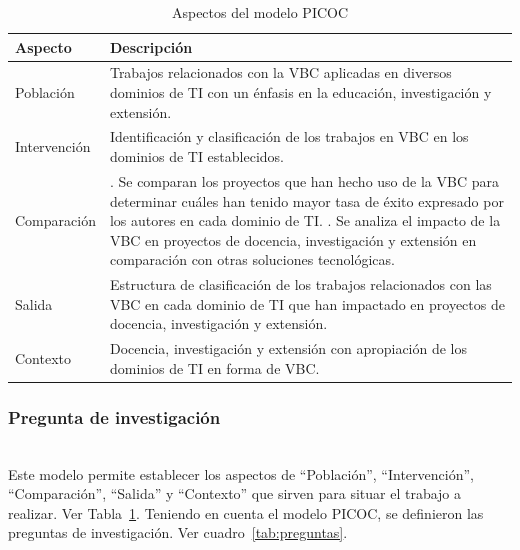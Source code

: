\begin{table}[tbp]
    \centering
    \renewcommand{\arraystretch}{1.4} %
    \begin{tabular}{>{\centering\arraybackslash}m{} >{\arraybackslash}m{}}
        \hline
        \textbf{Aspecto} & \textbf{Descripción} \\
        \hline
        Población & Trabajos relacionados con la VBC aplicadas en diversos dominios de TI con un énfasis en la educación, investigación y extensión. \\
        Intervención & Identificación y clasificación de los trabajos en VBC en los dominios de TI establecidos. \\
        Comparación & 
        1. Se comparan los proyectos que han hecho uso de la VBC para determinar cuáles han tenido mayor tasa de éxito expresado por los autores en cada dominio de TI. \newline
        2. Se analiza el impacto de la VBC en proyectos de docencia, investigación y extensión en comparación con otras soluciones tecnológicas. \\
        Salida & Estructura de clasificación de los trabajos relacionados con las VBC en cada dominio de TI que han impactado en proyectos de docencia, investigación y extensión. \\
        Contexto & Docencia, investigación y extensión con apropiación de los dominios de TI en forma de VBC. \\
        \hline
    \end{tabular}
    \caption{Aspectos del modelo PICOC}\label{tab:PICOC}
\end{table}



\subsubsection{Pregunta de investigación}
\mbox{}\\


Este modelo permite establecer los aspectos de ``Población'', ``Intervención'', ``Comparación'', ``Salida'' y ``Contexto'' que sirven para situar el trabajo a realizar. Ver Tabla~\ref{tab:PICOC}.
Teniendo en cuenta el modelo PICOC, se definieron las preguntas de investigación. Ver cuadro~\ref{tab:preguntas}.

